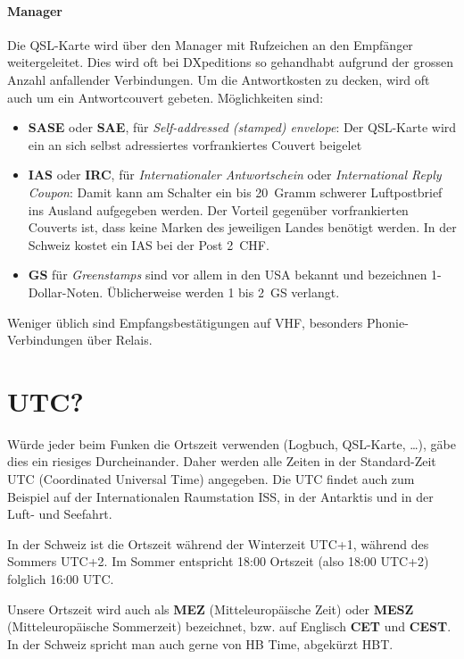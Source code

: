 \paragraph{Manager} \quad Die QSL-Karte wird über den Manager mit Rufzeichen  an den Empfänger weitergeleitet. Dies wird oft bei DXpeditions so gehandhabt aufgrund der grossen Anzahl anfallender Verbindungen. Um die Antwortkosten zu decken, wird oft auch um ein Antwortcouvert gebeten. Möglichkeiten sind:
\begin{itemize}
 \item \textbf{SASE} oder \textbf{SAE}, für \textit{Self-addressed (stamped) envelope}: Der QSL-Karte wird ein an sich selbst adressiertes vorfrankiertes Couvert beigelet
 \item \textbf{IAS} oder \textbf{IRC}, für \textit{Internationaler Antwortschein} oder \textit{International Reply Coupon}: Damit kann am Schalter ein bis 20~Gramm schwerer Luftpostbrief ins Ausland aufgegeben werden. Der Vorteil gegenüber vorfrankierten Couverts ist, dass keine Marken des jeweiligen Landes benötigt werden. In der Schweiz kostet ein IAS bei der Post 2~CHF.
 \item \textbf{GS} für \textit{Greenstamps} sind vor allem in den USA bekannt und bezeichnen 1-Dollar-Noten. Üblicherweise werden 1 bis 2~GS verlangt.
\end{itemize}


\vspace{1em}
Weniger üblich sind Empfangsbestätigungen auf VHF, besonders Phonie-Verbindungen über Relais.

\section{UTC?}\label{sec:utc}
Würde jeder beim Funken die Ortszeit verwenden (Logbuch, QSL-Karte, …), gäbe dies ein riesiges Durcheinander. Daher werden alle Zeiten in der Standard-Zeit UTC (Coordinated Universal Time) angegeben. Die UTC findet auch zum Beispiel auf der Internationalen Raumstation ISS, in der Antarktis und in der Luft- und Seefahrt.

In der Schweiz ist die Ortszeit während der Winterzeit UTC+1, während des Sommers UTC+2. Im Sommer entspricht 18:00 Ortszeit (also 18:00 UTC+2) folglich 16:00 UTC.

Unsere Ortszeit wird auch als \textbf{MEZ} (Mitteleuropäische Zeit) oder \textbf{MESZ} (Mitteleuropäische Sommer­zeit) bezeichnet, bzw. auf Englisch \textbf{CET} und \textbf{CEST}. In der Schweiz spricht man auch gerne von HB Time, abgekürzt HBT.